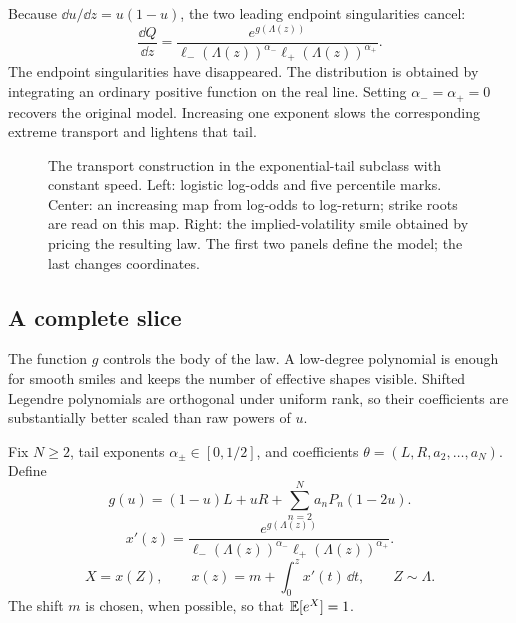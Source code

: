 Because $\dd u/\dd z=u(1-u)$, the two leading endpoint singularities cancel:
\begin{equation}
\frac{\dd Q}{\dd z}
=\frac{e^{g(\Lambda(z))}}
{\ell_-(\Lambda(z))^{\alpha_-}
 \ell_+(\Lambda(z))^{\alpha_+}}.
\label{eq:speed}
\end{equation}
The endpoint singularities have disappeared.  The distribution is obtained
by integrating an ordinary positive function on the real line.  Setting
$\alpha_-\!=\!\alpha_+\!=\!0$ recovers the original model.  Increasing one
exponent slows the corresponding extreme transport and lightens that tail.

\begin{figure}[htbp]
\centering
{}
\caption{The transport construction in the exponential-tail subclass with
constant speed.  Left: logistic log-odds and five percentile marks.  Center:
an increasing map from log-odds to log-return; strike roots are read on this
map.  Right: the implied-volatility smile obtained by pricing the resulting
law.  The first two panels define the model; the last changes coordinates.}
\label{fig:transport}
\end{figure}

\subsection{A complete slice}

The function $g$ controls the body of the law.  A low-degree polynomial is
enough for smooth smiles and keeps the number of effective shapes visible.
Shifted Legendre polynomials are orthogonal under uniform rank, so their
coefficients are substantially better scaled than raw powers of $u$.

\begin{definition}
\label{def:lqd}
Fix $N\ge2$, tail exponents $\alpha_\pm\in[0,1/2]$, and coefficients
$\theta=(L,R,a_2,\ldots,a_N)$.  Define
\begin{equation}
g(u)=(1-u)L+uR+\sum_{n=2}^N a_nP_n(1-2u).
\label{eq:gpoly}
\end{equation}
\begin{equation}
x'(z)=\frac{e^{g(\Lambda(z))}}
{\ell_-(\Lambda(z))^{\alpha_-}
 \ell_+(\Lambda(z))^{\alpha_+}}.
\label{eq:xspeed}
\end{equation}
\begin{equation}
\boxed{\quad X=x(Z),\qquad
x(z)=m+\int_0^z x'(t)\,\dd t,\qquad Z\sim\Lambda.\quad}
\label{eq:lqd}
\end{equation}
The shift $m$ is chosen, when possible, so that $\mathbb{E}[e^X]=1$.
\end{definition}

